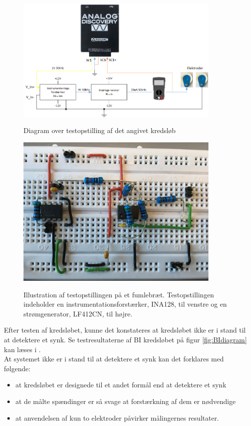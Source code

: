 \begin{figure}[H]
\centering
{\includegraphics[width=10cm]
{Figure/testopstilling11}}
\caption{Diagram over testopstilling af det angivet kredsløb}
\label{fig:testopstilling1}
\end{figure} 



\begin{figure}[H]
\centering
{\includegraphics[width=10cm]
{Figure/oprindeligekredslob2}}
\caption{Illustration af testopstillingen på et fumlebræt. Testopstillingen indeholder en instrumentationsforstærker, INA128, til venstre og en strømgenerator, LF412CN, til højre.}
\label{fig:celler}
\end{figure}

Efter testen af kredsløbet, kunne det konstateres at kredsløbet ikke er i stand til at detektere et synk. Se testresultaterne af BI kredsløbet på figur \ref{fig:BIdiagram} kan læses i   .\\

\pagebreak
At systemet ikke er i stand til at detektere et synk kan det forklares med følgende:


 
\begin{itemize}
\item at kredsløbet er designede til et andet formål end at detektere et synk
\item at de målte spændinger er så svage at forstærkning af dem er nødvendige
\item at anvendelsen af kun to elektroder påvirker målingernes resultater.  
\end{itemize}


